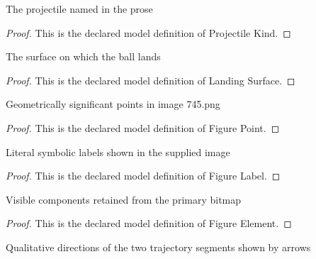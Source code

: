 \begin{definition}
  \label{def:physics:phyx-mini-0745:phyxminiproblems-problemphyxmini0745-projectilekind}
  The projectile named in the prose
\end{definition}
\begin{proof}
  This is the declared model definition of Projectile Kind.
\end{proof}
\begin{definition}
  \label{def:physics:phyx-mini-0745:phyxminiproblems-problemphyxmini0745-landingsurface}
  The surface on which the ball lands
\end{definition}
\begin{proof}
  This is the declared model definition of Landing Surface.
\end{proof}
\begin{definition}
  \label{def:physics:phyx-mini-0745:phyxminiproblems-problemphyxmini0745-figurepoint}
  Geometrically significant points in image 745.png
\end{definition}
\begin{proof}
  This is the declared model definition of Figure Point.
\end{proof}
\begin{definition}
  \label{def:physics:phyx-mini-0745:phyxminiproblems-problemphyxmini0745-figurelabel}
  Literal symbolic labels shown in the supplied image
\end{definition}
\begin{proof}
  This is the declared model definition of Figure Label.
\end{proof}
\begin{definition}
  \label{def:physics:phyx-mini-0745:phyxminiproblems-problemphyxmini0745-figureelement}
  Visible components retained from the primary bitmap
\end{definition}
\begin{proof}
  This is the declared model definition of Figure Element.
\end{proof}
\begin{definition}
  \label{def:physics:phyx-mini-0745:phyxminiproblems-problemphyxmini0745-arrowdirection}
  Qualitative directions of the two trajectory segments shown by arrows
\end{definition}
